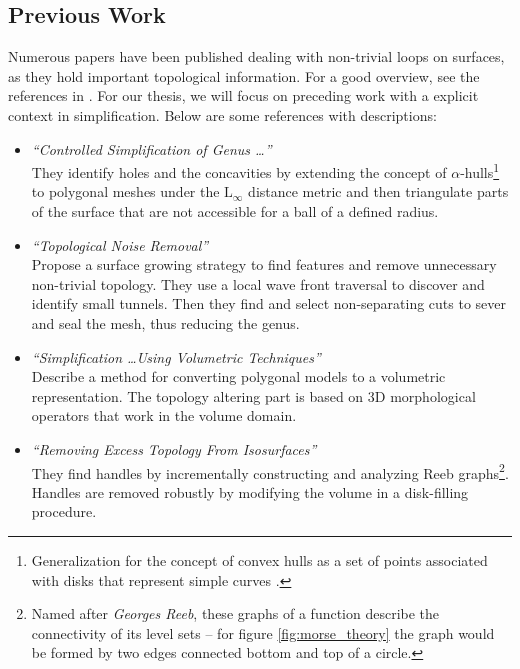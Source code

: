 \subsection{Previous Work}
\label{math_loop_previous_work}

Numerous papers have been published dealing with non-trivial loops on surfaces, as they hold important topological information.
For a good overview, see the references in \citep[][especially section 2]{Ni2004}.
For our thesis, we will focus on preceding work with a explicit context in simplification.
Below are some references with descriptions:
\begin{itemize}
	\item \citep[][]{El-Sana1997} \textit{``Controlled Simplification of Genus \dots''}\\
They identify holes and the concavities by extending the concept of $\alpha$-hulls\footnote{ Generalization for the concept of convex hulls as a set of points associated with disks that represent simple curves \citep[introduced by][]{Edelsbrunner1983}.} to polygonal meshes under the $\mathrm{L}_{\infty}$ distance metric and then triangulate parts of the surface that are not accessible for a ball of a defined radius.
	\item \citep[][]{Guskov2001} \textit{``Topological Noise Removal''}\\
Propose a surface growing strategy to find features and remove unnecessary non-trivial topology. They use a local wave front traversal to discover and identify small tunnels. Then they find and select non-separating cuts to sever and seal the mesh, thus reducing the genus.
	\item \citep[][]{Nooruddin2003} \textit{``Simplification \dots Using Volumetric Techniques''}\\
Describe a method for converting polygonal models to a volumetric representation. The topology altering part is based on 3D morphological operators that work in the volume domain.
	\item \citep[][]{Wood2004} \textit{``Removing Excess Topology From Isosurfaces''}\\
They find handles by incrementally constructing and analyzing Reeb graphs\footnote{ Named after \textit{Georges Reeb}, these graphs of a function describe the connectivity of its level sets -- for figure \ref{fig:morse_theory} the graph would be formed by two edges connected bottom and top of a circle.}. Handles are removed robustly by modifying the volume in a disk-filling procedure.

\end{itemize}

